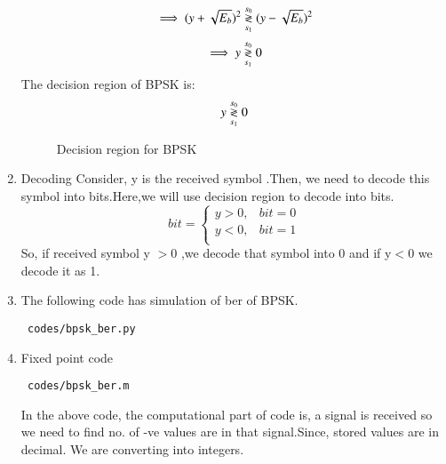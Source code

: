 \begin{enumerate}[label=\thesubsection.\arabic*.,ref=\thesubsection.\theenumi]
\begin{align}
     \implies (y+\sqrt{E_b})^2 \overset{s_0}{\underset{s_1}{\gtrless}} (y - \sqrt{E_b})^2
     \label{eq:ee18btech11042_10}
\end{align}
\begin{align}
    \implies y \overset{s_0}{\underset{s_1}{\gtrless}} 0
    \label{eq:ee18btech11042_11}
\end{align}
The decision region of BPSK is:
\begin{align}
    y \overset{s_0}{\underset{s_1}{\gtrless}} 0
    \label{eq:ee18btech11042_12}
\end{align}
\begin{figure}[!h]
		\resizebox{\columnwidth}{!}{}
\caption{Decision region for BPSK}
\label{fig:ee18btech11042_2}
\end{figure}
\item Decoding 
\newline
Consider, y is the received symbol .Then, we need to decode this symbol into bits.Here,we will  use decision region  to decode into bits.
\[ bit =   \left\{
\begin{array}{cc}

    y>0 ,&     bit = 0 \\
    y<0, &     bit = 1 \\
\end{array}
\right .\]
So, if received symbol y $>$0 ,we decode that symbol into 0  and if y$<$0 we decode it as 1.
\item The following code has simulation of ber of BPSK.
\begin{lstlisting}
 codes/bpsk_ber.py
\end{lstlisting}
\item Fixed point code

\begin{lstlisting}
 codes/bpsk_ber.m
\end{lstlisting}
In the above code, the computational part of code is,
\newline  a signal  is received so we need to find  no. of  -ve values  are in that signal.Since, stored values are in decimal.
We are converting into integers. 


\end{enumerate}
